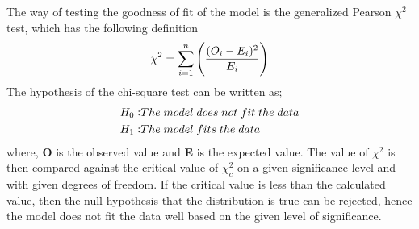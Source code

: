 The way of testing the goodness of fit of the model is the generalized Pearson $\chi^2$ test, which
has the following definition
\begin{equation}
	\centering
	\chi^2 = \sum_{i=1}^{n}\left(\frac{(O_{i}-E_{i})^2}{E_{i}}\right)	
\end{equation}
The hypothesis of the chi-square test can be written as;
\begin{equation}
	\centering
	\label{eqn:chihypo}
	\begin{aligned}
		H_{0}:&  The \; model \; does \; not \; fit \; the \; data\\ 
		H_{1}:&  The \; model \; fits \; the \; data	
	\end{aligned}
\end{equation}
where, \textbf{O} is the observed value and \textbf{E} is the expected value.
The value of $\chi^2$ is then compared against the critical value of $\chi^2_c $ on a given significance level and with given degrees of freedom. If the critical value is less than the calculated value, then the null hypothesis that the distribution is true can be rejected, hence the model does not fit the data well based on the given level of significance.


	

	 

